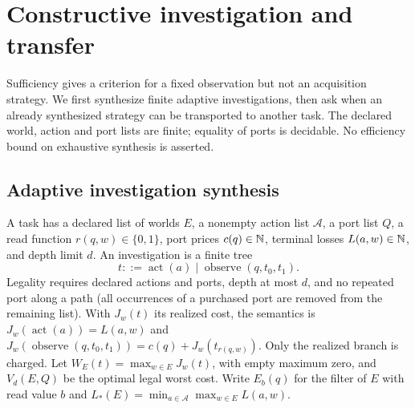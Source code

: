 \section{Constructive investigation and transfer}\label{sec:investigation}
Sufficiency gives a criterion for a fixed observation but not an acquisition strategy. We first synthesize finite adaptive investigations, then ask when an already synthesized strategy can be transported to another task. The declared world, action and port lists are finite; equality of ports is decidable. No efficiency bound on exhaustive synthesis is asserted.

\subsection{Adaptive investigation synthesis}
A task has a declared list of worlds $E$, a nonempty action list $\mathcal A$, a port list $Q$, a read function $r(q,w)\in\{0,1\}$, port prices $c(q)\in\mathbb N$, terminal losses $L(a,w)\in\mathbb N$, and depth limit $d$. An investigation is a finite tree
\[
 t ::= \operatorname{act}(a)\mid\operatorname{observe}(q,t_0,t_1).
\]
Legality requires declared actions and ports, depth at most $d$, and no repeated port along a path (all occurrences of a purchased port are removed from the remaining list). With $J_w(t)$ its realized cost, the semantics is $J_w(\operatorname{act}(a))=L(a,w)$ and $J_w(\operatorname{observe}(q,t_0,t_1))=c(q)+J_w(t_{r(q,w)})$. Only the realized branch is charged. Let $W_E(t)=\max_{w\in E}J_w(t)$, with empty maximum zero, and $V_d(E,Q)$ be the optimal legal worst cost. Write $E_b(q)$ for the filter of $E$ with read value $b$ and $L_*(E)=\min_{a\in\mathcal A}\max_{w\in E}L(a,w)$.

